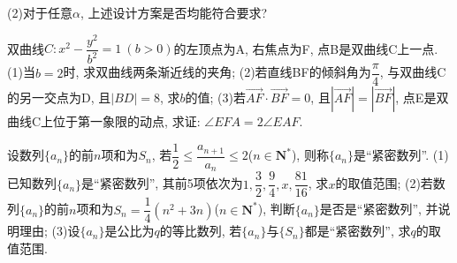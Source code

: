 \documentclass[10pt,a4paper]{article}
\begin{document}
(2)对于任意$\alpha$, 上述设计方案是否均能符合要求?
\item 双曲线$C:x^2-\dfrac{y^2}{b^2}=1\ (b>0)$的左顶点为A, 右焦点为F, 点B是双曲线C上一点.
(1)当$b=2$时, 求双曲线两条渐近线的夹角;
(2)若直线BF的倾斜角为$\dfrac{\pi }4$, 与双曲线C的另一交点为D, 且$|BD|=8$, 求$b$的值;
(3)若$\overrightarrow{AF}\cdot \overrightarrow{BF}=0$, 且$|\overrightarrow{AF}|=|\overrightarrow{BF}|$, 点E是双曲线C上位于第一象限的动点,
求证: $\angle EFA=2\angle EAF$.
\item 设数列$\{a_n\}$的前$n$项和为$S_n$, 若$\dfrac 12\le \dfrac{a_{n+1}}{a_n}\le 2$($n\in \mathbf{N}^*$), 则称$\{a_n\}$是``紧密数列''.
(1)已知数列$\{a_n\}$是``紧密数列'', 其前5项依次为$1,\dfrac 32,\dfrac 94,x,\dfrac{81}{16}$, 求$x$的取值范围;
(2)若数列$\{a_n\}$的前$n$项和为$S_n=\dfrac 14(n^2+3n)$($n\in \mathbf{N}^*$), 判断$\{a_n\}$是否是``紧密数列'',
并说明理由;
(3)设$\{a_n\}$是公比为$q$的等比数列, 若$\{a_n\}$与$\{S_n\}$都是``紧密数列'', 求$q$的取值范围.
\end{document}
